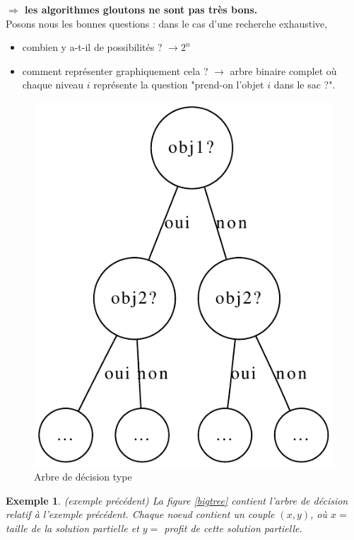 \documentclass{article}
\newtheorem{exemple}{Exemple}[section]
\begin{document}
\begin{sffamily}
\textbf{$\Rightarrow$ les algorithmes gloutons ne sont pas très bons.} \\

\noindent Posons nous les bonnes questions : dans le cas d'une recherche exhaustive,
\begin{itemize}
\item combien y a-t-il de possibilités ? $\rightarrow 2^n$
\item comment représenter graphiquement cela ? $\rightarrow$ arbre binaire complet où chaque niveau $i$ représente la question "prend-on
l'objet $i$ dans le sac ?".
\end{itemize}

\begin{figure}[h!]
    \begin{center}
    \includegraphics[scale=0.5]{arbredec1.pdf}
    \caption{Arbre de décision type}
    \end{center}
\end{figure}

\begin{exemple}(exemple précédent) La figure \ref{bigtree} contient l'arbre de décision relatif à l'exemple précédent. Chaque noeud contient
un couple $(x,y)$, où $x=$ taille de la solution partielle et $y=$ profit de cette solution partielle. \\


\end{exemple}
\end{sffamily}
\end{document}
